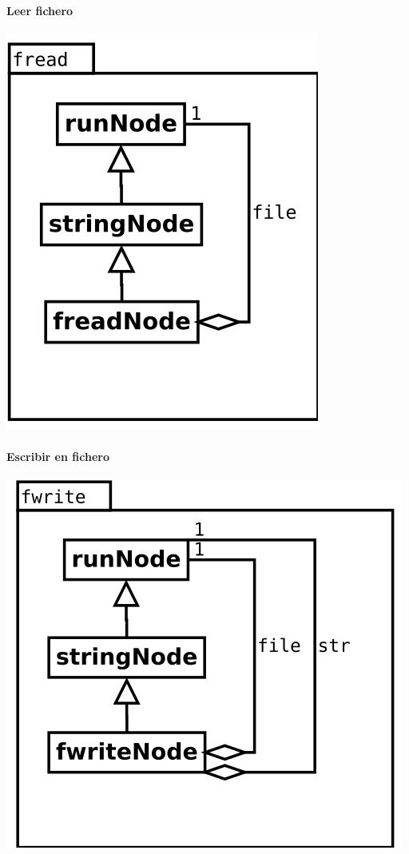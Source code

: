 \begin{multicols}{2}
   \paragraph {Leer fichero} 
   \begin{center}
   \includegraphics[scale=0.4]{fread.png} \\
   \end{center}

   \paragraph {Escribir en fichero} 
   \begin{center}
   \includegraphics[scale=0.4]{fwrite.png} \\
   \end{center}
\end{multicols}

